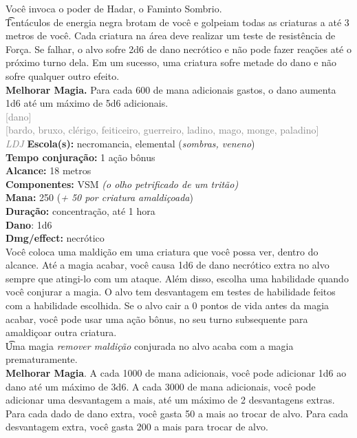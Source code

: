 \documentclass{RPG_Adventure}[2021/10/20]
\begin{document}
{\normalsize Você invoca o poder de Hadar, o Faminto Sombrio.\\\t Tentáculos de energia negra brotam de você e golpeiam todas as criaturas a até 3 metros de você. Cada criatura na área deve realizar um teste de resistência de Força. Se falhar, o alvo sofre 2d6 de dano necrótico e não pode fazer reações até o próximo turno dela. Em um sucesso, uma criatura sofre metade do dano e não sofre qualquer outro efeito.\\\t \textbf{Melhorar Magia.} Para cada 600 de mana adicionais gastos, o dano aumenta 1d6 até um máximo de 5d6 adicionais.\\}
{\scriptsize \textcolor{gray}{[dano]\\}}
{\scriptsize \textcolor{gray}{[bardo, bruxo, clérigo, feiticeiro, guerreiro, ladino, mago, monge, paladino]\\}}
{\tiny \textcolor{gray}{\textit{LDJ}}}
{\small \t \textbf{Escola(s):} necromancia, elemental (\textit{sombras, veneno})\\\t \textbf{Tempo conjuração:} 1 ação bônus\\\t \textbf{Alcance:} 18 metros\\\t \textbf{Componentes:} VSM \textit{(o olho petrificado de um tritão)}\\\t \textbf{Mana:} 250 (\textit{+ 50 por criatura amaldiçoada})\\\t \textbf{Duração:} concentração, até 1 hora\\\t \textbf{Dano}: 1d6\\\t \textbf{Dmg/effect:} necrótico\\}
{\normalsize Você coloca uma maldição em uma criatura que você possa ver, dentro do alcance. Até a magia acabar, você causa 1d6 de dano necrótico extra no alvo sempre que atingi-lo com um ataque. Além disso, escolha uma habilidade quando você conjurar a magia. O alvo tem desvantagem em testes de habilidade feitos com a habilidade escolhida.  Se o alvo cair a 0 pontos de vida antes da magia acabar, você pode usar uma ação bônus, no seu turno subsequente para amaldiçoar outra criatura.\\\t Uma magia \textit{remover maldição} conjurada no alvo acaba com a magia prematuramente.\\\t \textbf{Melhorar Magia}. A cada 1000 de mana adicionais, você pode adicionar 1d6 ao dano até um máximo de 3d6. A cada 3000 de mana adicionais, você pode adicionar uma desvantagem a mais, até um máximo de 2 desvantagens extras. Para cada dado de dano extra, você gasta 50 a mais ao trocar de alvo. Para cada desvantagem extra, você gasta 200 a mais para trocar de alvo.\\}
\end{document}
